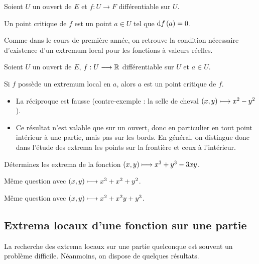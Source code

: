 \begin{defi}
Soient \(U\) un ouvert de \(E\) et \(f:U\to F\) différentiable sur \(U\).

Un point critique de \(f\) est un point \(a\in U\) tel que \(\odif{f}\paren{a}=0\).
\end{defi}

Comme dans le cours de première année, on retrouve la condition nécessaire d'existence d'un extremum local pour les fonctions à valeurs réelles.

\begin{prop}
Soient \(U\) un ouvert de \(E\), \(f:U\longrightarrow\mathbb{R}\) différentiable sur \(U\) et \(a\in U\).

Si \(f\) possède un extremum local en \(a\), alors \(a\) est un point critique de \(f\).
\end{prop}

\begin{rem}
\begin{itemize}
    \item La réciproque est fausse (contre-exemple : la selle de cheval \(\left(x,y\right)\longmapsto x^2-y^2\)). \\
    \item Ce résultat n'est valable que sur un ouvert, donc en particulier en tout point intérieur à une partie, mais pas sur les bords. En général, on distingue donc dans l'étude des extrema les points sur la frontière et ceux à l'intérieur.
\end{itemize}
\end{rem}

\begin{exo}
Déterminez les extrema de la fonction \(\left(x,y\right)\longmapsto x^3+y^3-3xy\).
\end{exo}

\begin{exo}
Même question avec \(\left(x,y\right)\longmapsto x^3+x^2+y^2\).
\end{exo}

\begin{exo}
Même question avec \(\left(x,y\right)\longmapsto x^2+x^2y+y^3\).
\end{exo}

\subsection{Extrema locaux d'une fonction sur une partie}

La recherche des extrema locaux sur une partie quelconque est souvent un problème difficile. Néanmoins, on dispose de quelques résultats.

